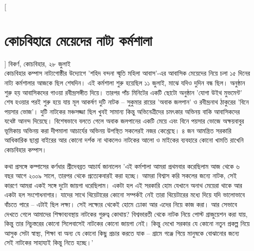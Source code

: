 \documentclass{article}
\newcommand\EN[1]{	 
\fontsize{#1}{#1}\fontspec{Ubuntu}}
\newcommand\BN[1]{ %
\fontsize{#1}{#1}\fontspec[Script=Bengali]{Baban12}}
\newcommand\BBI[1]{ %
\fontsize{#1}{#1}\fontspec[Script=Bengali, FakeSlant=0.2]{BabanBold12}}
\begin{document}
\begin{minipage}[t]{102mm} %
\vspace{8mm}
\setlength{\baselineskip}{2pt}
\setlength{\parskip}{0.15ex} 
\setlength{\parindent}{10pt}
\begin{multicols}{2}%
[\section*{\Centering \BN{28.611}কোচবিহারে মেয়েদের নাট্য কর্মশালা
\\[2mm]
}]
\setcounter{columnbadness}{7000}
\setcounter{finalcolumnbadness}{7000}
\BBI{12.2545}বিকর্ণ, কোচবিহার, ২৮ জুলাই\EN{10}\textbullet\\[0.5mm]
\BN{12.06}কোচবিহার কম্পাস নাট্যগোষ্ঠীর উদ্যোগে 'শহিদ বন্দনা স্মৃতি মহিলা আবাস'-এর আবাসিক মেয়েদের নিয়ে চলা ১৫ দিনের নাট্য কর্মশালার আজকে ছিল শেষদিন। এই কর্মশালা শুরু হয়েছিল ১১ জুলাই, মাঝে যদিও দুদিন বন্ধ ছিল। অনুষ্ঠান শুরু হয় আবাসিকদের গাওয়া রবীন্দ্রসঙ্গীত দিয়ে। তারপর পাঁচ মিনিটের একটি ছোটো অনুষ্ঠান 'যোগা উইথ মুভমেন্ট' শেষ হওয়ার পরই শুরু হয়ে যায় মূল আকর্ষণ দুটি নাটক -- সুকুমার রায়ের 'অবাক জলপান' ও রবীন্দ্রনাথ ঠাকুরের 'বিনে পয়সার ভোজ'। দুটি নাটকের মঞ্চসজ্জা ছিল খুবই সামান্য কিন্তু অভিনেত্রীদের চমৎকার অভিনয় বাকি আবাসিকদের যথেষ্ট আনন্দ দিয়েছে। বিশেষভাবে বলতে গেলে অবাক জলপানের একটি মেয়ে এবং বিনে পয়সার ভোজে অক্ষয়বাবুর ভূমিকায় অভিনয় করা দীপমালা আচার্যের অভিনয় উপস্থিত সকলেরই নজর কেশ্তেছে। ৪ জন আমন্ত্রিত সরকারি আধিকারিক ছাশ্তা বাইরের আর কোনো দর্শক না থাকলেও নাটকের আলো ও মাইকের ব্যবহারে কোনো খামতি রাখেনি কোচবিহার কম্পাস।

কথা প্রসঙ্গে কম্পাসের কর্ণধার শ্রীদেবব্রত আচার্য জানালেন 'এই কর্মশালা আমরা প্রথমবার করেছিলাম আজ থেকে ৬ বছর আগে ২০০৯ সালে, তারপর থেকে প্রত্যেকবারই করা হচ্ছে। আমরা বিশ্বাস করি সকলের জন্যে নাটক, সেই কারণে আমরা একই সঙ্গে দুটো জায়গা ধরেছিলাম। একটা হল এই সরকারি হোম যেখানে অনাথ মেয়েরা থাকে আর একটা হল সংশোধনাগার। যাদের সাথে থিয়েটারের কোনো সম্পর্কই নেই তারা থিয়েটারের মধ্যে দিয়ে যদি ভালোভাবে বাঁচতে পারে -- এটাই ছিল লক্ষ্য। সেই লক্ষ্যের থেকেই হোমে ঢোকা আর এদের নিয়ে কাজ করা। আর সেভাবে দেখতে গেলে আমাদের শিক্ষাব্যবস্থায় নাটকের গুরুত্ব কোথায়? বিশ্বভারতী থেকে নাটক নিয়ে পোস্ট গ্রাজুয়েশন করা যায়, কিন্তু তার নিচুস্তরের কোনো সিলেবাসেই নাটকের কোনো জায়গা নেই। কিন্তু দেখো সরকার যে কোনো নতুন প্রকল্প নিয়ে আসুক সেটা স্বাস্থ্য, শিক্ষা বা অন্য যে কোনো কিছু প্রচার করতে যাক -- গ্রামে গঞ্জে গিয়ে মানুষকে বোঝানোর জন্যে সেই নাটকের সাহায্যই কিন্তু নিতে হচ্ছে।' 


\end{multicols}
\end{minipage}
\end{document}
